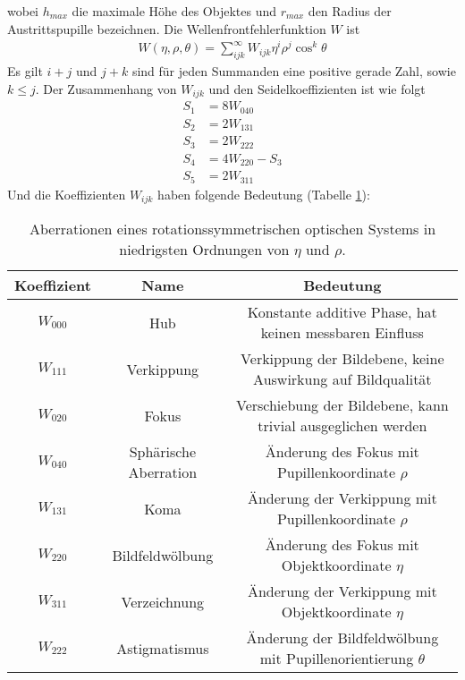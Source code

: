 \documentclass[twoside,colorback,accentcolor=tud4c,11pt]{tudreport}
\begin{document}
wobei $ h_{max} $ die maximale Höhe des Objektes
und $ r_{max} $ den Radius der Austrittspupille bezeichnen. Die Wellenfrontfehlerfunktion $W$ ist
\begin{align}
W(\eta,\rho,\theta)=\sum_{ijk}^{\infty}W_{ijk}\eta^i\rho^j\cos^k\theta
\end{align}
Es gilt $i+j$ und $j+k$ sind für jeden Summanden eine positive gerade Zahl, sowie $k\leq j$. Der Zusammenhang von $ W_{ijk} $ und den Seidelkoeffizienten ist wie folgt
\begin{align}
S_1&=8W_{040}\\
S_2&=2W_{131}\\
S_3&=2W_{222}\\
S_4&=4W_{220}-S_3\\
S_5&=2W_{311}
\end{align}
Und die Koeffizienten $ W_{ijk} $ haben folgende Bedeutung (Tabelle \ref{tab:W}):
\begin{table}[H]
\centering
\begin{tabular}{|c|c|c|}
\hline 
Koeffizient & Name & Bedeutung \\ 
\hline 
$W_{000}$ & Hub & Konstante additive Phase, hat keinen messbaren Einfluss \\ 
$W_{111}$ & Verkippung & Verkippung der Bildebene, keine Auswirkung auf Bildqualität \\ 
$W_{020}$ & Fokus & Verschiebung der Bildebene, kann trivial ausgeglichen werden \\ 
\hline 
$W_{040}$ & Sphärische Aberration & Änderung des Fokus mit Pupillenkoordinate $\rho$ \\  
$W_{131}$ & Koma & Änderung der Verkippung mit Pupillenkoordinate $\rho$ \\
$W_{220}$ & Bildfeldwölbung & Änderung des Fokus mit Objektkoordinate $\eta$ \\
$W_{311}$ & Verzeichnung & Änderung der Verkippung mit Objektkoordinate $\eta$ \\ 
$W_{222}$ & Astigmatismus & Änderung der Bildfeldwölbung mit Pupillenorientierung $\theta$ \\ 
\hline 
\end{tabular} 
\caption{Aberrationen eines rotationssymmetrischen optischen Systems in niedrigsten Ordnungen von $\eta$ und $\rho$. \cite{anl}} \label{tab:W}
\end{table}
\end{document}
